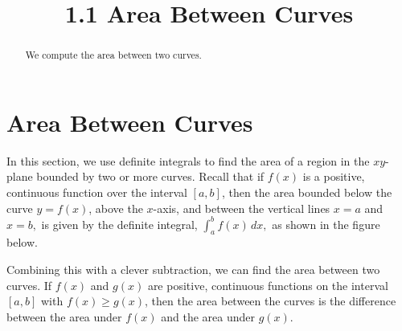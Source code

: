 \documentclass[handout]{ximera}
\title{1.1 Area Between Curves}
\begin{document}
\begin{abstract}
We compute the area between two curves.
\end{abstract}

\maketitle

\section{Area Between Curves}

In this section, we use definite integrals to find the area of a region 
in the $xy$-plane bounded by two or more curves. Recall that if $f(x)$ is a positive, continuous function 
over the interval $[a, b]$, then the area bounded below the curve $ y= f(x)$, above the $x$-axis, and between the 
vertical lines $x = a$
and $x = b,$ is given by the definite integral, $\int_a^b f(x) \, dx,$ as shown in the figure below.


\begin{image}
\end{image}


Combining this with a clever subtraction, we can find the area between two curves.
If $f(x)$ and $g(x)$ are positive, continuous functions on the interval $[a,b]$ with $f(x) \geq g(x)$,
then the area between the curves is the difference between the area under $f(x)$ and the area under $g(x)$.
\end{document}
